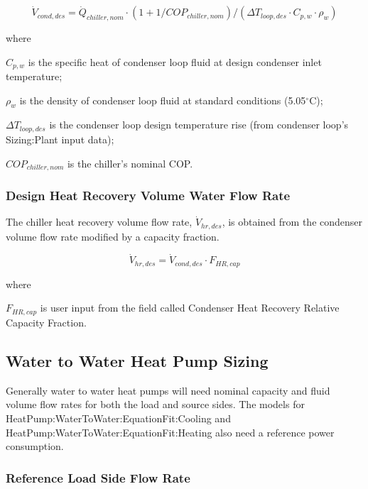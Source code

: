 \begin{equation}
\dot V_{cond,des} = \dot Q_{chiller,nom} \cdot (1 + 1/COP_{chiller,nom})/(\Delta T_{loop,des} \cdot C_{p,w} \cdot \rho_w)
\end{equation}

where

\( C_{p,w} \) is the specific heat of condenser loop fluid at design condenser inlet temperature;

\( \rho_w \) is the density of condenser loop fluid at standard conditions (5.05\(^{\circ}\)C);

\( \Delta T_{loop,des} \) is the condenser loop design temperature rise (from condenser loop's Sizing:Plant input data);

\( COP_{chiller,nom} \) is the chiller's nominal COP.

\subsubsection{Design Heat Recovery Volume Water Flow Rate}\label{design-heat-recovery-chiller-volume-water-flow-rate}

The chiller heat recovery volume flow rate, \( \dot V_{hr,des} \), is obtained from the condenser volume flow rate modified by a capacity fraction.

\begin{equation}
\dot V_{hr,des} = \dot V_{cond,des} \cdot F_{HR,cap}
\end{equation}

where

\( F_{HR,cap} \) is user input from the field called Condenser Heat Recovery Relative Capacity Fraction.


\subsection{Water to Water Heat Pump Sizing}\label{WWHP-sizing}

Generally water to water heat pumps will need nominal capacity and fluid volume flow rates for both the load and source sides.  The models for HeatPump:WaterToWater:EquationFit:Cooling and HeatPump:WaterToWater:EquationFit:Heating also need a reference power consumption.

\subsubsection{Reference Load Side Flow Rate}\label{WWHP-ref-load-side-flow-rate}

